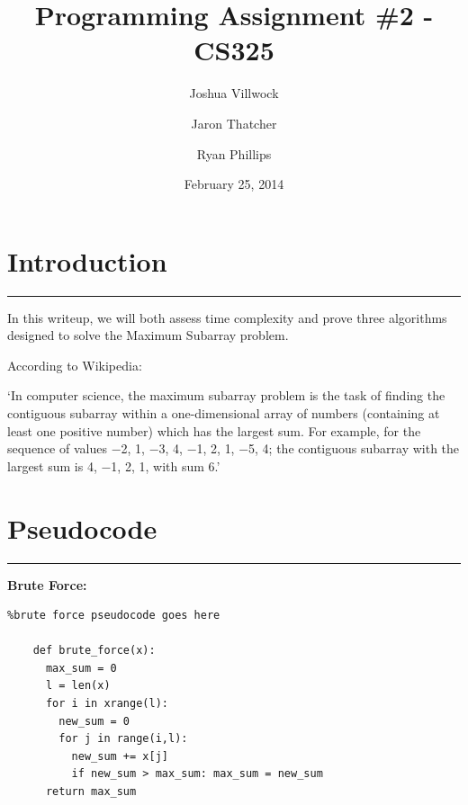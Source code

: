 \documentclass[letterpaper,10pt,titlepage,fleqn]{article}
\begin{document}
\lstset{language=Python} 

\title{Programming Assignment \#2 - CS325}

\author{
	Joshua Villwock \and
	Jaron Thatcher \and
	Ryan Phillips
}

\date{February 25, 2014}
\maketitle







\section*{Introduction}
\hrule

In this writeup, we will both assess time complexity and prove three algorithms designed to solve the Maximum Subarray problem. 
\par

According to Wikipedia:

\par

`In computer science, the maximum subarray problem is the task of finding the contiguous subarray within a one-dimensional array of numbers (containing at least one positive number) which has the largest sum. For example, for the sequence of values −2, 1, −3, 4, −1, 2, 1, −5, 4; the contiguous subarray with the largest sum is 4, −1, 2, 1, with sum 6.'

\section*{Pseudocode}
\hrule
\begin{centering}

    \textbf{Brute Force:}
    \end{centering}

    \lstset{ numbers=left }

    \begin{lstlisting}%brute force pseudocode goes here

    def brute_force(x): 
      max_sum = 0
      l = len(x)
      for i in xrange(l):
        new_sum = 0
        for j in range(i,l):
          new_sum += x[j] 
          if new_sum > max_sum: max_sum = new_sum
      return max_sum

    \end{lstlisting}
\end{document}
